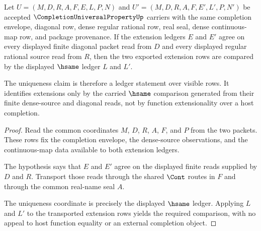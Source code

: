 \begin{theorem}
\label{thm:completion-universal-property-uniqueness-ledger}
Let $U=(M,D,R,A,F,E,L,P,N)$ and $U'=(M,D,R,A,F,E',L',P,N')$ be accepted $\CompletionUniversalPropertyUp$ carriers with the same completion envelope, diagonal row, dense regular rational row, real seal, dense continuous-map row, and package provenance. If the extension ledgers $E$ and $E'$ agree on every displayed finite diagonal packet read from $D$ and every displayed regular rational source read from $R$, then the two exported extension rows are compared by the displayed $\hsame$ ledger $L$ and $L'$.

The uniqueness claim is therefore a ledger statement over visible rows. It identifies extensions only by the carried $\hsame$ comparison generated from their finite dense-source and diagonal reads, not by function extensionality over a host completion.
\end{theorem}
\begin{proof}
Read the common coordinates $M$, $D$, $R$, $A$, $F$, and $P$ from the two packets. These rows fix the completion envelope, the dense-source observations, and the continuous-map data available to both extension ledgers.

The hypothesis says that $E$ and $E'$ agree on the displayed finite reads supplied by $D$ and $R$. Transport those reads through the shared $\Cont$ routes in $F$ and through the common real-name seal $A$.

The uniqueness coordinate is precisely the displayed $\hsame$ ledger. Applying $L$ and $L'$ to the transported extension rows yields the required comparison, with no appeal to host function equality or an external completion object.
\end{proof}

